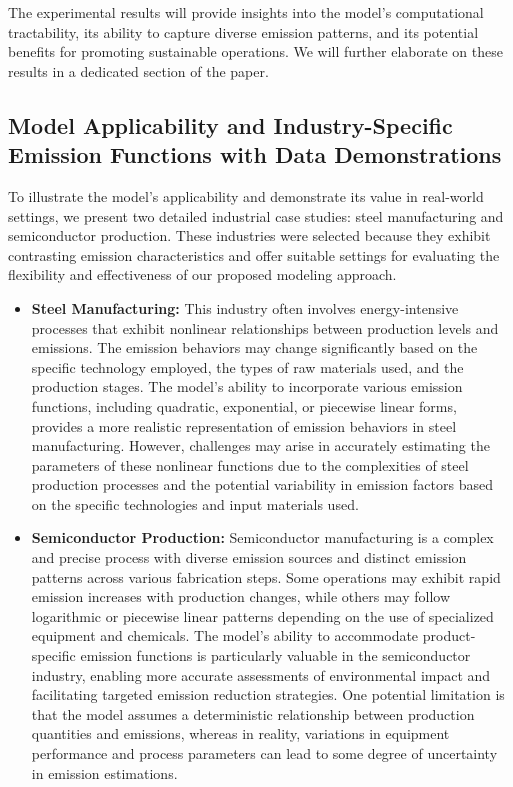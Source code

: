 \documentclass[final,3p,times,review,authoryear]{elsarticle}
\begin{document}
The experimental results will provide insights into the model's computational tractability, its ability to capture diverse emission patterns, and its potential benefits for promoting sustainable operations. We will further elaborate on these results in a dedicated section of the paper.

\subsection{Model Applicability and Industry-Specific Emission Functions with Data Demonstrations}
To illustrate the model's applicability and demonstrate its value in real-world settings, we present two detailed industrial case studies: steel manufacturing and semiconductor production. These industries were selected because they exhibit contrasting emission characteristics and offer suitable settings for evaluating the flexibility and effectiveness of our proposed modeling approach.
\begin{itemize}
    \item \textbf{Steel Manufacturing:} This industry often involves energy-intensive processes that exhibit nonlinear relationships between production levels and emissions. The emission behaviors may change significantly based on the specific technology employed, the types of raw materials used, and the production stages. The model's ability to incorporate various emission functions, including quadratic, exponential, or piecewise linear forms, provides a more realistic representation of emission behaviors in steel manufacturing. However, challenges may arise in accurately estimating the parameters of these nonlinear functions due to the complexities of steel production processes and the potential variability in emission factors based on the specific technologies and input materials used.
    \item \textbf{Semiconductor Production:} Semiconductor manufacturing is a complex and precise process with diverse emission sources and distinct emission patterns across various fabrication steps. Some operations may exhibit rapid emission increases with production changes, while others may follow logarithmic or piecewise linear patterns depending on the use of specialized equipment and chemicals. The model's ability to accommodate product-specific emission functions is particularly valuable in the semiconductor industry, enabling more accurate assessments of environmental impact and facilitating targeted emission reduction strategies. One potential limitation is that the model assumes a deterministic relationship between production quantities and emissions, whereas in reality, variations in equipment performance and process parameters can lead to some degree of uncertainty in emission estimations.
\end{itemize}
\end{document}
